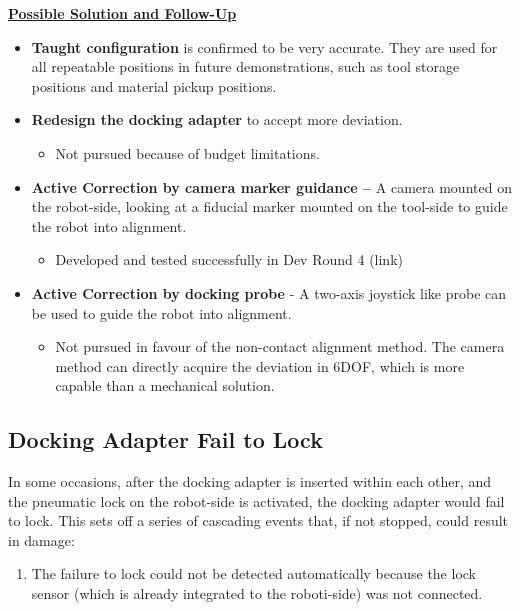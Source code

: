 {\textbf{\ul{Possible Solution and Follow-Up}}

\begin{itemize}
	\item \textbf{Taught configuration} is confirmed to be very accurate. They are used for all repeatable positions in future demonstrations, such as tool storage positions and material pickup positions.

	\item \textbf{Redesign the docking adapter} to accept more deviation.

\begin{itemize}
	\item Not pursued because of budget limitations.

\end{itemize}
	\item \textbf{Active Correction by camera marker guidance --} A camera mounted on the robot-side, looking at a fiducial marker mounted on the tool-side to guide the robot into alignment.

\begin{itemize}
	\item Developed and tested successfully in Dev Round 4 (link)

\end{itemize}
	\item  \textbf{Active Correction by docking probe} - A two-axis joystick like probe can be used to guide the robot into alignment.

\begin{itemize}
	\item Not pursued in favour of the non-contact alignment method. The camera method can directly acquire the deviation in 6DOF, which is more capable than a mechanical solution.

\end{itemize}
\end{itemize}

\subsection{Docking Adapter Fail to Lock}

In some occasions, after the docking adapter is inserted within each other, and the pneumatic lock on the robot-side is activated, the docking adapter would fail to lock. This sets off a series of cascading events that, if not stopped, could result in damage:

\begin{enumerate}
	\item The failure to lock could not be detected automatically because the lock sensor (which is already integrated to the roboti-side) was not connected.


\end{enumerate}}
